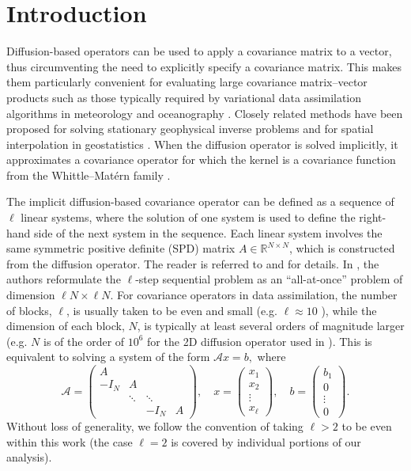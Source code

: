 \documentclass{article}
\newcommand{\sizeA}{N}
\theoremstyle{definition}
\begin{document}
	\section{Introduction}
	{Diffusion-based operators can be used to apply a covariance matrix to a vector, thus circumventing the need to explicitly specify a covariance matrix. This makes them particularly convenient for evaluating large covariance matrix--vector products such as those typically required by variational data assimilation algorithms in meteorology and oceanography \cite{weaver_correlation_2016,guillet2019modelling}. Closely related methods have been proposed for solving stationary geophysical inverse problems \cite{buithanh13,tarantola05} and for spatial interpolation in geostatistics \cite{lindgren11,Simpson_2012}. When the diffusion operator is solved implicitly, it approximates a covariance operator for which the kernel is a covariance function from the Whittle--Mat\'ern family \cite{Guttorp_2006,Weaver_2013}.}
	
	
	The implicit diffusion-based covariance operator can be defined as a sequence of $\ell$ linear systems, where the solution of one system is used to define the right-hand side of the next system in the sequence. Each linear system involves the same symmetric positive definite (SPD) matrix $A \in \mathbb{R}^{\sizeA\times \sizeA}$, which is constructed from the diffusion operator. The reader is referred to \cite[Section 2]{weaver_correlation_2016} and \cite{weaver2018time} for details. In \cite{weaver2018time}, the authors reformulate the $\ell$-step sequential problem as an ``all-at-once'' problem of dimension $\ell \sizeA \times \ell \sizeA$. For covariance operators in data assimilation, the number of blocks, $\ell$, is usually taken to be even and small (e.g. $\ell\approx 10$
	\cite{weaver2018time, Goux_2024, Chrust_2025}), while the dimension of each block, $\sizeA$, is typically at least several orders of magnitude larger (e.g. $N$ is of the order of $10^6$ for the 2D diffusion operator used in \cite{Chrust_2025}). This is equivalent to solving a system of the form $\mathcal{A}x = b,$ 
	where
	\begin{equation}\label{eq:A}
		\mathcal{A} = \begin{pmatrix}
			{A} \\
			-I_\sizeA & {A} \\
			& \ddots & \ddots \\
			&& -I_\sizeA & {A}
		\end{pmatrix}, \quad x = \begin{pmatrix}
			x_1 \\ x_2 \\ \vdots \\ x_\ell
		\end{pmatrix}, \quad b = \begin{pmatrix}
			b_1 \\ 0\\ \vdots \\ 0
		\end{pmatrix}.
	\end{equation}
	Without loss of generality, we follow the convention of taking $\ell > 2$ to be even within this work (the case $\ell = 2$ is covered by individual portions of our analysis).
	
\end{document}
